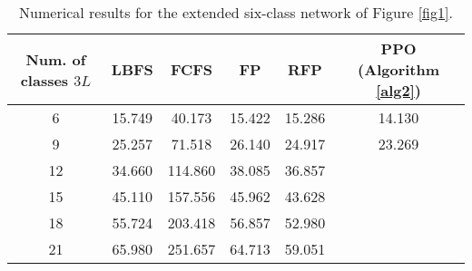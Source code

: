 \documentclass[11pt]{article}
\theoremstyle{definition}
\numberwithin{equation}{section}
\begin{document}
\begin{table}[H]
\centering%
\begin{tabular}{|c|c|c|c|c|c|}
  \hline
  Num. of classes $3L$  & LBFS & FCFS & FP & RFP & PPO (Algorithm \ref{alg2})\\\hline
  6 & 15.749 & 40.173 & 15.422 & 15.286 &14.130 \\\hline
  9 & 25.257 & 71.518 & 26.140 & 24.917& 23.269 \\\hline
  12  & 34.660 & 114.860 & 38.085 & 36.857&  \\\hline
  15  & 45.110  & 157.556  & 45.962 & 43.628&  \\\hline
  18  & 55.724 & 203.418 & 56.857  & 52.980  &  \\\hline
  21  & 65.980 & 251.657 & 64.713 & 59.051 &  \\
  \hline
\end{tabular}
\caption[]{Numerical results for the extended six-class network of Figure \ref{fig1}.}\label{tab6extRes}
\end{table}
\end{document}
